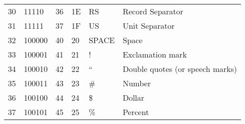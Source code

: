 \begin{center}
\begin{longtable}{llllll}
\rowcolor[HTML]{F3F6F6} 
{\color[HTML]{404040} 30}               & {\color[HTML]{404040} 11110}           & {\color[HTML]{404040} 36}             & {\color[HTML]{404040} 1E}                   & {\color[HTML]{404040} RS}                 & {\color[HTML]{404040} Record Separator}                      \\
\rowcolor[HTML]{FCFCFC} 
{\color[HTML]{404040} 31}               & {\color[HTML]{404040} 11111}           & {\color[HTML]{404040} 37}             & {\color[HTML]{404040} 1F}                   & {\color[HTML]{404040} US}                 & {\color[HTML]{404040} Unit Separator}                        \\
\rowcolor[HTML]{F3F6F6} 
{\color[HTML]{404040} 32}               & {\color[HTML]{404040} 100000}          & {\color[HTML]{404040} 40}             & {\color[HTML]{404040} 20}                   & {\color[HTML]{404040} SPACE}              & {\color[HTML]{404040} Space}                                 \\
\rowcolor[HTML]{FCFCFC} 
{\color[HTML]{404040} 33}               & {\color[HTML]{404040} 100001}          & {\color[HTML]{404040} 41}             & {\color[HTML]{404040} 21}                   & {\color[HTML]{404040} !}                  & {\color[HTML]{404040} Exclamation mark}                      \\
\rowcolor[HTML]{F3F6F6} 
{\color[HTML]{404040} 34}               & {\color[HTML]{404040} 100010}          & {\color[HTML]{404040} 42}             & {\color[HTML]{404040} 22}                   & {\color[HTML]{404040} “}                  & {\color[HTML]{404040} Double quotes (or speech marks)}       \\
\rowcolor[HTML]{FCFCFC} 
{\color[HTML]{404040} 35}               & {\color[HTML]{404040} 100011}          & {\color[HTML]{404040} 43}             & {\color[HTML]{404040} 23}                   & {\color[HTML]{404040} \#}                 & {\color[HTML]{404040} Number}                                \\
\rowcolor[HTML]{F3F6F6} 
{\color[HTML]{404040} 36}               & {\color[HTML]{404040} 100100}          & {\color[HTML]{404040} 44}             & {\color[HTML]{404040} 24}                   & {\color[HTML]{404040} \$}                 & {\color[HTML]{404040} Dollar}                                \\
\rowcolor[HTML]{FCFCFC} 
{\color[HTML]{404040} 37}               & {\color[HTML]{404040} 100101}          & {\color[HTML]{404040} 45}             & {\color[HTML]{404040} 25}                   & {\color[HTML]{404040} \%}                 & {\color[HTML]{404040} Percent}                               \\

\end{longtable}
\end{center}
